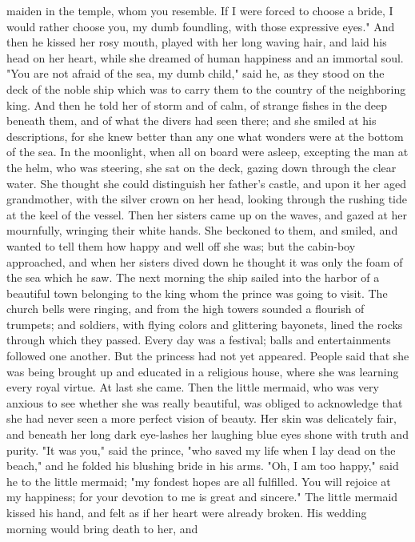 maiden in the temple, whom you resemble. If I were forced to choose
a bride, I would rather choose you, my dumb foundling, with those
expressive eyes." And then he kissed her rosy mouth, played with her
long waving hair, and laid his head on her heart, while she dreamed of
human happiness and an immortal soul. "You are not afraid of the
sea, my dumb child," said he, as they stood on the deck of the noble
ship which was to carry them to the country of the neighboring king.
And then he told her of storm and of calm, of strange fishes in the
deep beneath them, and of what the divers had seen there; and she
smiled at his descriptions, for she knew better than any one what
wonders were at the bottom of the sea.
    In the moonlight, when all on board were asleep, excepting the man
at the helm, who was steering, she sat on the deck, gazing down
through the clear water. She thought she could distinguish her
father's castle, and upon it her aged grandmother, with the silver
crown on her head, looking through the rushing tide at the keel of the
vessel. Then her sisters came up on the waves, and gazed at her
mournfully, wringing their white hands. She beckoned to them, and
smiled, and wanted to tell them how happy and well off she was; but
the cabin-boy approached, and when her sisters dived down he thought
it was only the foam of the sea which he saw.
    The next morning the ship sailed into the harbor of a beautiful
town belonging to the king whom the prince was going to visit. The
church bells were ringing, and from the high towers sounded a flourish
of trumpets; and soldiers, with flying colors and glittering bayonets,
lined the rocks through which they passed. Every day was a festival;
balls and entertainments followed one another.
    But the princess had not yet appeared. People said that she was
being brought up and educated in a religious house, where she was
learning every royal virtue. At last she came. Then the little
mermaid, who was very anxious to see whether she was really beautiful,
was obliged to acknowledge that she had never seen a more perfect
vision of beauty. Her skin was delicately fair, and beneath her long
dark eye-lashes her laughing blue eyes shone with truth and purity.
    "It was you," said the prince, "who saved my life when I lay
dead on the beach," and he folded his blushing bride in his arms. "Oh,
I am too happy," said he to the little mermaid; "my fondest hopes
are all fulfilled. You will rejoice at my happiness; for your devotion
to me is great and sincere."
    The little mermaid kissed his hand, and felt as if her heart
were already broken. His wedding morning would bring death to her, and
